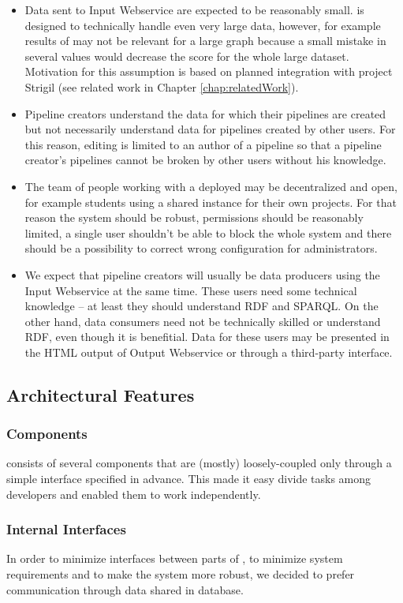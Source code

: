 \begin{itemize}
	\item Data sent to Input Webservice are expected to be reasonably small. \odcs is designed to technically handle even very large data, however, for example results of \QA may not be relevant for a large graph because a small mistake in several values would decrease the \QA score for the whole large dataset. Motivation for this assumption is based on planned integration with project Strigil (see related work in Chapter \ref{chap:relatedWork}).
	\item Pipeline creators understand the data for which their pipelines are created but not necessarily understand data for pipelines created by other users. For this reason, editing is limited to an author of a pipeline so that a pipeline creator's pipelines cannot be broken by other users without his knowledge.
	\item The team of people working with a deployed \odcs may be decentralized and open, for example students using a shared instance for their own projects. For that reason the system should be robust, permissions should be reasonably limited, a single user shouldn't be able to block the whole system and there should be a possibility to correct wrong configuration for administrators.
	\item We expect that pipeline creators will usually be  data producers  using the Input Webservice at the same time. These users need some technical knowledge -- at least they should understand RDF and SPARQL. On the other hand, data consumers need not be technically skilled or understand RDF, even though it is benefitial. Data for these users may be presented in the HTML output of Output Webservice or through a third-party interface.
\end{itemize}


\subsection{Architectural Features}

\subsubsection{Components}
\odcs consists of several components that are (mostly) loosely-coupled only through a simple interface specified in advance. This made it easy divide tasks among developers and enabled them to work independently.

\subsubsection{Internal Interfaces}
In order to minimize interfaces between parts of \odcs, to minimize system requirements and to make the system more robust, we decided to prefer communication through data shared in database.

